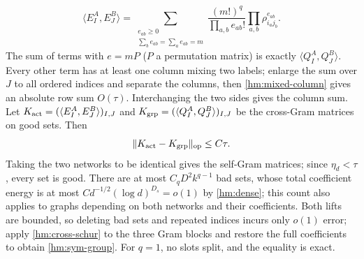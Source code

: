 \documentclass[a4paper]{tufte-handout}
\begin{document}
\begin{fullwidth}
\[
 \langle E_I^A,E_J^B\rangle
 =\sum_{\substack{e_{ab}\ge0\\\sum_be_{ab}=\sum_ae_{ab}=m}}
 \frac{(m!)^q}{\prod_{a,b}e_{ab}!}\prod_{a,b}\rho_{i_aj_b}^{e_{ab}}.
\]
The sum of terms with $e=mP$ ($P$ a permutation matrix) is exactly $\langle Q_I^A,Q_J^B\rangle$.
Every other term has at least one column mixing two labels; enlarge the sum over $J$ to all ordered indices and separate the columns,
then \eqref{hm:mixed-column} gives an absolute row sum $O(\tau)$. Interchanging the two sides gives the column sum.
Let $K_{\rm act}=(\langle E_I^A,E_J^B\rangle)_{I,J}$ and
$K_{\rm grp}=(\langle Q_I^A,Q_J^B\rangle)_{I,J}$ be the cross-Gram matrices on good sets. Then
\begin{equation}\label{hm:cross-schur}
 \|K_{\rm act}-K_{\rm grp}\|_{\rm op}\le C\tau.
\end{equation}
Taking the two networks to be identical gives the self-Gram matrices; since $\eta_d<\tau$, every set is good.
There are at most $C_qD^2k^{q-1}$ bad sets, whose total coefficient energy is at most
$Cd^{-1/2}(\log d)^{D_s}=o(1)$ by \eqref{hm:dense}; this count also applies to graphs depending on both networks and their coefficients.
Both lifts are bounded, so deleting bad sets and repeated indices incurs only $o(1)$ error; apply
\eqref{hm:cross-schur} to the three Gram blocks and restore the full coefficients to obtain \eqref{hm:sym-group}.
For $q=1$, no slots split, and the equality is exact.


\end{fullwidth}
\end{document}

